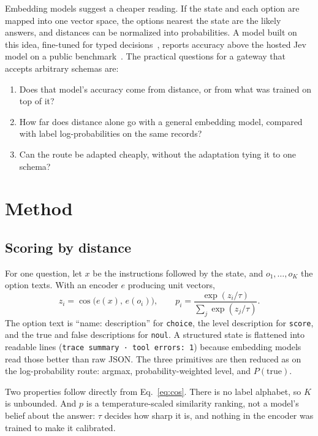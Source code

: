 \documentclass[11pt]{article}
\begin{document}
Embedding models suggest a cheaper reading. If the state and each option are
mapped into one vector space, the options nearest the state are the likely
answers, and distances can be normalized into probabilities. A model built on
this idea, fine-tuned for typed decisions~\cite{egtd}, reports accuracy above
the hosted Jev model on a public benchmark~\cite{td}. The practical questions
for a gateway that accepts arbitrary schemas are:

\begin{enumerate}
\item Does that model's accuracy come from distance, or from what was trained
on top of it?
\item How far does distance alone go with a general embedding model, compared
with label log-probabilities on the same records?
\item Can the route be adapted cheaply, without the adaptation tying it to one
schema?
\end{enumerate}

\section{Method}

\subsection{Scoring by distance}

For one question, let $x$ be the instructions followed by the state, and
$o_1,\dots,o_K$ the option texts. With an encoder $e$ producing unit vectors,
\begin{equation}
z_i = \cos\bigl(e(x),\,e(o_i)\bigr), \qquad
p_i = \frac{\exp(z_i/\tau)}{\sum_j \exp(z_j/\tau)} .
\label{eq:cos}
\end{equation}
The option text is ``name: description'' for \texttt{choice}, the level
description for \texttt{score}, and the true and false descriptions for
\texttt{noul}. A structured state is flattened into readable lines
(\texttt{trace summary · tool errors: 1}) because embedding models read those
better than raw JSON. The three primitives are then reduced as on the
log-probability route: argmax, probability-weighted level, and $P(\text{true})$.

Two properties follow directly from Eq.~\eqref{eq:cos}. There is no label
alphabet, so $K$ is unbounded. And $p$ is a temperature-scaled similarity
ranking, not a model's belief about the answer: $\tau$ decides how sharp it
is, and nothing in the encoder was trained to make it calibrated.
\end{document}
